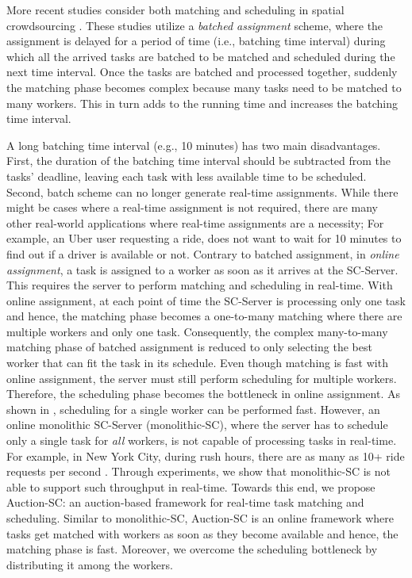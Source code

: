 More recent studies consider both matching and scheduling in spatial crowdsourcing \cite{Deng15,Chen15,Guo16}. These studies utilize a \textit{batched assignment} scheme, where the assignment is delayed for a period of time (i.e., batching time interval) during which all the arrived tasks are batched to be matched and scheduled during the next time interval. Once the tasks are batched and processed together, suddenly the matching phase becomes complex because many tasks need to be matched to many workers. This in turn adds to the running time and increases the batching time interval. 


A long batching time interval (e.g., 10 minutes) has two main disadvantages.  First, the duration of the batching time interval should be subtracted from the tasks' deadline, leaving each task with less available time to be scheduled. Second, batch scheme can no longer generate real-time assignments. While there might be cases where a real-time assignment is not required, there are many other real-world applications where real-time assignments are a necessity; For example, an Uber user requesting a ride, does not want to wait for 10 minutes to find out if a driver is available or not. Contrary to batched assignment, in \textit{online assignment}, a task is assigned to a worker as soon as it arrives at the SC-Server. This requires the server to perform matching and scheduling in real-time. With online assignment, at each point of time the SC-Server is processing only one task and hence, the matching phase becomes a one-to-many matching where there are multiple workers and only one task. Consequently, the complex many-to-many matching phase of batched assignment is reduced to only selecting the best worker that can fit the task in its schedule. Even though matching is fast with online assignment, the server must still perform scheduling for multiple workers. Therefore, the scheduling phase becomes the bottleneck in online assignment. As shown in \cite{Li15}, scheduling for a single worker can be performed fast. However, an online monolithic\cite{Stephens15} SC-Server (monolithic-SC), where the server has to schedule only a single task for \emph{all} workers, is not capable of processing tasks in real-time. For example, in New York City, during rush hours, there are as many as 10+ ride requests per second \cite{NYCTaxi}. Through experiments, we show that monolithic-SC is not able to support such throughput in real-time. Towards this end, we propose Auction-SC: an auction-based framework for real-time task matching and scheduling. Similar to monolithic-SC, Auction-SC is an online framework where tasks get matched with workers as soon as they become available and hence, the matching phase is fast. Moreover, we overcome the scheduling bottleneck by distributing it among the workers.

